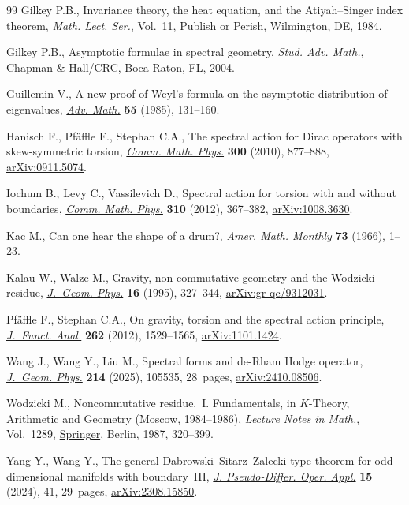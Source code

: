 \documentclass[pdftex]{sigma}
\numberwithin{equation}{section}
\theoremstyle{definition}
\begin{document}
\begin{thebibliography}{99}
Gilkey P.B., Invariance theory, the heat equation, and the {A}tiyah--{S}inger
 index theorem, \textit{Math. Lect. Ser.}, Vol.~11, Publish or Perish,
 Wilmington, DE, 1984.

Gilkey P.B., Asymptotic formulae in spectral geometry, \textit{Stud. Adv. Math.},
 Chapman \& Hall/CRC, Boca Raton, FL, 2004.

Guillemin V., A new proof of {W}eyl's formula on the asymptotic distribution of
 eigenvalues, \href{https://doi.org/10.1016/0001-8708(85)90018-0}{\textit{Adv.
 Math.}} \textbf{55} (1985), 131--160.

Hanisch F., Pf\"affle F., Stephan C.A., The spectral action for {D}irac
 operators with skew-symmetric torsion,
 \href{https://doi.org/10.1007/s00220-010-1135-3}{\textit{Comm. Math. Phys.}}
 \textbf{300} (2010), 877--888,
 \href{http://arxiv.org/abs/0911.5074}{arXiv:0911.5074}.

Iochum B., Levy C., Vassilevich D., Spectral action for torsion with and
 without boundaries,
 \href{https://doi.org/10.1007/s00220-011-1406-7}{\textit{Comm. Math. Phys.}}
 \textbf{310} (2012), 367--382,
 \href{http://arxiv.org/abs/1008.3630}{arXiv:1008.3630}.

Kac M., Can one hear the shape of a drum?,
 \href{https://doi.org/10.2307/2313748}{\textit{Amer. Math. Monthly}}
 \textbf{73} (1966), 1--23.

Kalau W., Walze M., Gravity, non-commutative geometry and the {W}odzicki
 residue, \href{https://doi.org/10.1016/0393-0440(94)00032-Y}{\textit{J.~Geom.
 Phys.}} \textbf{16} (1995), 327--344,
 \href{http://arxiv.org/abs/gr-qc/9312031}{arXiv:gr-qc/9312031}.

Pf\"affle F., Stephan C.A., On gravity, torsion and the spectral action
 principle, \href{https://doi.org/10.1016/j.jfa.2011.11.013}{\textit{J.~Funct.
 Anal.}} \textbf{262} (2012), 1529--1565,
 \href{http://arxiv.org/abs/1101.1424}{arXiv:1101.1424}.

Wang J., Wang Y., Liu M., Spectral forms and de-{R}ham {H}odge operator,
 \href{https://doi.org/10.1016/j.geomphys.2025.105535}{\textit{J.~Geom.
 Phys.}} \textbf{214} (2025), 105535, 28~pages,
 \href{http://arxiv.org/abs/2410.08506}{arXiv:2410.08506}.

Wodzicki M., Noncommutative residue.~{I}. {F}undamentals, in {$K$}-{T}heory,
 {A}rithmetic and {G}eometry ({M}oscow, 1984--1986), \textit{Lecture Notes in
 Math.}, Vol.~1289, \href{https://doi.org/10.1007/BFb0078372}{Springer},
 Berlin, 1987, 320--399.

Yang Y., Wang Y., The general {D}abrowski--{S}itarz--{Z}alecki type theorem for
 odd dimensional manifolds with boundary~{III},
 \href{https://doi.org/10.1007/s11868-024-00604-3}{\textit{J. Pseudo-Differ.
 Oper. Appl.}} \textbf{15} (2024), 41, 29~pages,
 \href{http://arxiv.org/abs/2308.15850}{arXiv:2308.15850}.

\end{thebibliography}\LastPageEnding
\end{document}
